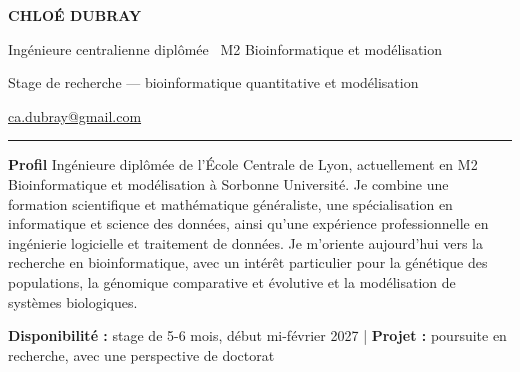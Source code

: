 \documentclass[9pt,a4paper]{article}
\begin{document}
\fontsize{9.0}{10.8}\selectfont
\color{ink}

\noindent


{\fontsize{24}{26}\selectfont
\bfseries\color{ink}CHLOÉ DUBRAY\par}

\vspace{2pt}

{\large\color{accent}
Ingénieure centralienne diplômée
\textbar\
M2 Bioinformatique et modélisation\par}

\vspace{1pt}

{\normalsize\color{muted}
Stage de recherche — bioinformatique quantitative et modélisation\par}

\vspace{6pt}

{\footnotesize
\href{mailto:ca.dubray@gmail.com}{ca.dubray@gmail.com}
\quad
\par}

\vspace{5pt}
{\color{accent}\rule{\linewidth}{1.7pt}}
\vspace{7pt}


{\normalsize\bfseries\color{accent}Profil}
\quad
Ingénieure diplômée de l’École Centrale de Lyon,
actuellement en M2 Bioinformatique et modélisation
à Sorbonne Université. Je combine une formation scientifique et mathématique généraliste, une spécialisation en informatique et science des données, ainsi qu'une expérience professionnelle en ingénierie logicielle et traitement de données. Je m'oriente aujourd'hui vers la recherche en bioinformatique, avec un intérêt particulier pour la génétique des populations, la génomique comparative et évolutive et la modélisation de systèmes biologiques.
\par

\vspace{4pt}

{\small\color{muted}
\textbf{Disponibilité :}
stage de 5-6 mois, début mi-février 2027
\quad\textcolor{rule}{|}
\quad
\textbf{Projet :}
poursuite en recherche, avec une perspective de doctorat
\par}
\end{document}
